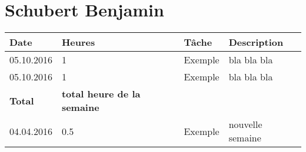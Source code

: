 \documentclass[french]{article}
\begin{document}
	\section*{Schubert Benjamin}
	\begin{longtable}{p{}|p{}|p{}|p{}}
		Date&Heures&Tâche&Description\\
		\hline \hline
		05.10.2016 & 1 & Exemple & bla bla bla\\
		05.10.2016 & 1 & Exemple & bla bla bla\\
		\textbf{Total} & \textbf{total heure de la semaine} &&\\
		\hline
		04.04.2016 & 0.5 & Exemple & nouvelle semaine \\
	\end{longtable}
	
\end{document}
